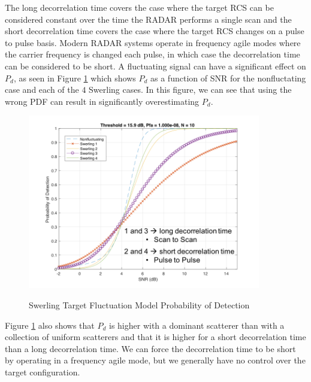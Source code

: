 \renewcommand{\baselinestretch}{2} \small\normalsize

The long decorrelation time covers the case where the target RCS can be considered constant over the time the RADAR performs a single scan and the short decorrelation time covers the case where the target RCS changes on a pulse to pulse basis. Modern RADAR systems operate in frequency agile modes where the carrier frequency is changed each pulse, in which case the decorrelation time can be considered to be short. A fluctuating signal can have a significant effect on $P_d$, as seen in Figure \ref{env_fig:4} which shows $P_d$ as a function of SNR for the nonfluctating case and each of the $4$ Swerling cases. In this figure, we can see that using the wrong PDF can result in significantly overestimating $P_d$.
\begin{figure}[H]
  \begin{center}
\includegraphics[width=4in]{../media/multistatic/swerling_pd.png}
  \end{center}
  \renewcommand{\baselinestretch}{1} \small\normalsize
  \begin{quote}
    \caption[Swerling Target Fluctuation Model Probability of Detection]{Swerling Target Fluctuation Model Probability of Detection\label{env_fig:4}}
  \end{quote}
\end{figure}
\renewcommand{\baselinestretch}{2} \small\normalsize

Figure \ref{env_fig:4} also shows that $P_d$ is higher with a dominant scatterer than with a collection of uniform scatterers and that it is higher for a short decorrelation time than a long decorrelation time. We can force the decorrelation time to be short by operating in a frequency agile mode, but we generally have no control over the target configuration.

